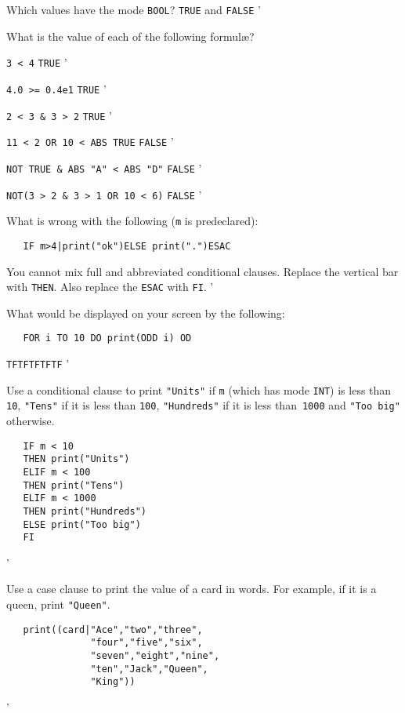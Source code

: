 \begin{exercise}
\item Which values have the mode \verb|BOOL|? \ans \verb|TRUE| and
\verb|FALSE|
'
\item What is the value of each of the following formul{\ae}?
\begin{subex}
\item \verb|3 < 4| \subans \verb|TRUE|
'
\item \verb|4.0 >= 0.4e1| \subans \verb|TRUE|
'
\item \verb|2 < 3 & 3 > 2| \subans \verb|TRUE|
'
\item \verb|11 < 2 OR 10 < ABS TRUE| \subans \verb|FALSE|
'
\item \verb|NOT TRUE & ABS "A" < ABS "D"| \subans \verb|FALSE|
'
\item \verb|NOT(3 > 2 & 3 > 1 OR 10 < 6)| \subans \verb|FALSE|
'
\end{subex}
\item What is wrong with the following (\verb|m| is predeclared):
\begin{verbatim}
   IF m>4|print("ok")ELSE print(".")ESAC
\end{verbatim}
\indent\ans You cannot mix full and abbreviated conditional
clauses.  Replace the vertical bar with \verb|THEN|. Also replace the
\verb|ESAC| with \verb|FI|.
'
\item What would be displayed on your screen by the following:
\begin{verbatim}
   FOR i TO 10 DO print(ODD i) OD
\end{verbatim}
\indent\ans \verb|TFTFTFTFTF|
'
\item Use a conditional clause to print \verb|"Units"| if \verb|m|
(which has mode \verb|INT|) is less than \verb|10|, \verb|"Tens"| if
it is less than \verb|100|, \verb|"Hundreds"| if it is less
than~\verb|1000| and \verb|"Too big"| otherwise. \ans \ %
\begin{verbatim}
   IF m < 10
   THEN print("Units")
   ELIF m < 100
   THEN print("Tens")
   ELIF m < 1000
   THEN print("Hundreds")
   ELSE print("Too big")
   FI
\end{verbatim}
'
\item Use a case clause to print the value of a card in words. For
example, if it is a queen, print \verb|"Queen"|.
\ans \ %
\begin{verbatim}
   print((card|"Ace","two","three",
               "four","five","six",
               "seven","eight","nine",
               "ten","Jack","Queen",
               "King"))
\end{verbatim}
'
\end{exercise}
